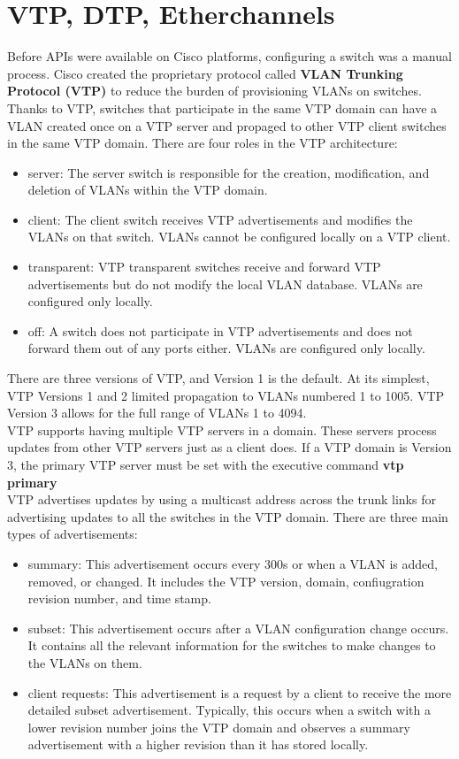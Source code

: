 \documentclass{article}
\begin{document}
\section*{VTP, DTP, Etherchannels}
Before APIs were available on Cisco platforms, configuring a switch was a manual process. Cisco created the proprietary protocol called \textbf{VLAN Trunking Protocol (VTP)} to reduce the burden of provisioning VLANs on switches. Thanks to VTP, switches that participate in the same VTP domain can have a VLAN created once on a VTP server and propaged to other VTP client switches in the same VTP domain. There are four roles in the VTP architecture:
	\begin{itemize}
		\item server: The server switch is responsible for the creation, modification, and deletion of VLANs within the VTP domain.
		\item client: The client switch receives VTP advertisements and modifies the VLANs on that switch. VLANs cannot be configured locally on a VTP client.
		\item transparent: VTP transparent switches receive and forward VTP advertisements but do not modify the local VLAN database. VLANs are configured only locally.
		\item off: A switch does not participate in VTP advertisements and does not forward them out of any ports either. VLANs are configured only locally.
	\end{itemize}

There are three versions of VTP, and Version 1 is the default. At its simplest, VTP Versions 1 and 2 limited propagation to VLANs numbered 1 to 1005. VTP Version 3 allows for the full range of VLANs 1 to 4094.\\

VTP supports having multiple VTP servers in a domain. These servers process updates from other VTP servers just as a client does. If a VTP domain is Version 3, the primary VTP server must be set with the executive command \textbf{vtp primary}\\

VTP advertises updates by using a multicast address across the trunk links for advertising updates to all the switches in the VTP domain. There are three main types of advertisements:
	\begin{itemize}
		\item summary: This advertisement occurs every 300s or when a VLAN is added, removed, or changed. It includes the VTP version, domain, confiugration revision number, and time stamp.
		\item subset: This advertisement occurs after a VLAN configuration change occurs. It contains all the relevant information for the switches to make changes to the VLANs on them.
		\item client requests: This advertisement is a request by a client to receive the more detailed subset advertisement. Typically, this occurs when a switch with a lower revision number joins the VTP domain and observes a summary advertisement with a higher revision than it has stored locally.
	\end{itemize}
\end{document}
